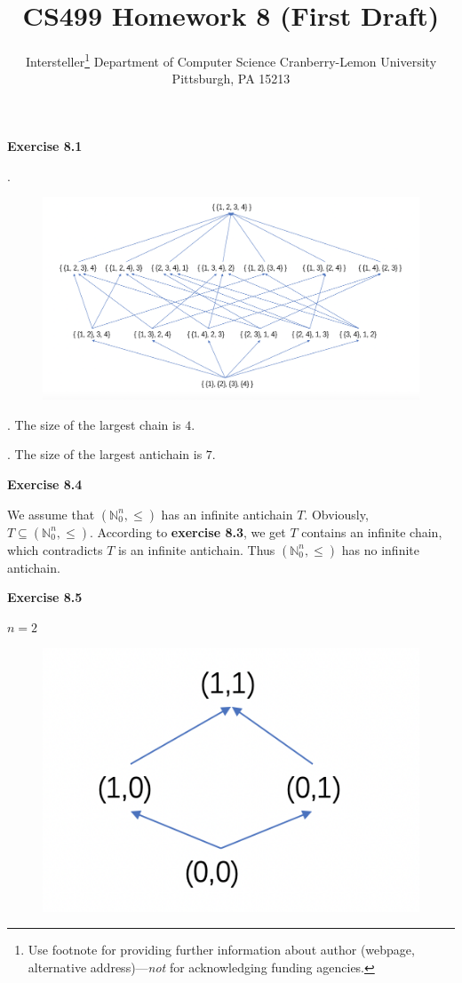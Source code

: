 \documentclass{article} %
\title{CS499 Homework 8 (First Draft)}
\author{
	Intersteller\thanks{ Use footnote for providing further information
		about author (webpage, alternative address)---\emph{not} for acknowledging
		funding agencies.}
	Department of Computer Science
	Cranberry-Lemon University
	Pittsburgh, PA 15213
}
\begin{document}
	\maketitle
	\textbf{Exercise 8.1}\par
	.\par
  	\begin{figure}[H]
  	\centering
  	\includegraphics[scale=0.5]{8_1.png}
  	\caption{}
  	\label{}
  	\end{figure}
	. The size of the largest chain is $4$.\par
	 . The size of the largest antichain is $7$.\par 
	\textbf{Exercise 8.4}\par
	We assume that $(\mathbb{N}_{0}^{n},\leq)$ has an infinite antichain $T$. Obviously, $T \subseteq  (\mathbb{N}_{0}^{n},\leq)$. 
	According to \textbf{exercise 8.3}, we get $T$ contains an infinite chain, which contradicts $T$ is an infinite antichain. 
	Thus $(\mathbb{N}_{0}^{n},\leq)$ has no infinite antichain.\par
	\textbf{Exercise 8.5}\par
	$n=2$\par
	 \begin{figure}[H]
  	\centering
  	\includegraphics[scale=0.5]{8_5_1.png}
  	\caption{}
  	\label{}
  	\end{figure}
\end{document}

